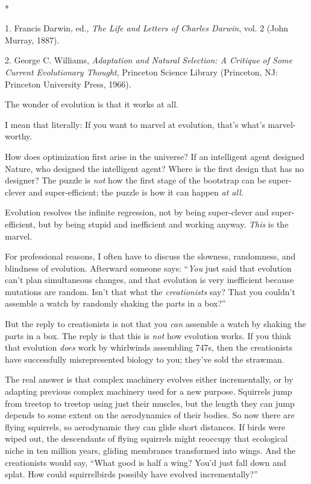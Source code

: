 {\centering
 \ ~
\par}

{\centering
 *
\par}


\bigskip

{
 1. Francis Darwin, ed., \textit{The Life and Letters of Charles
Darwin}, vol. 2 (John Murray, 1887).}

{
 2. George C. Williams, \textit{Adaptation and Natural Selection: A
Critique of Some Current Evolutionary Thought}, Princeton Science
Library (Princeton, NJ: Princeton University Press, 1966).}


{
 The wonder of evolution is that it works at all. }

{
 I mean that literally: If you want to marvel at evolution,
that's what's marvel-worthy.}

{
 How does optimization first arise in the universe? If an
intelligent agent designed Nature, who designed the intelligent agent?
Where is the first design that has no designer? The puzzle is
\textit{not} how the first stage of the bootstrap can be super-clever
and super-efficient; the puzzle is how it can happen \textit{at all.}}

{
 Evolution resolves the infinite regression, not by being
super-clever and super-efficient, but by being stupid and inefficient
and working anyway. \textit{This} is the marvel.}

{
 For professional reasons, I often have to discuss the slowness,
randomness, and blindness of evolution. Afterward someone says:
``\textit{You} just said that evolution
can't plan simultaneous changes, and that evolution is
very inefficient because mutations are random. Isn't
that what the \textit{creationists} say? That you
couldn't assemble a watch by randomly shaking the parts
in a box?''}

{
 But the reply to creationists is not that you \textit{can}
assemble a watch by shaking the parts in a box. The reply is that this
is \textit{not} how evolution works. If you think that evolution
\textit{does} work by whirlwinds assembling 747s, then the creationists
have successfully misrepresented biology to you;
they've sold the strawman.}

{
 The real answer is that complex machinery evolves either
incrementally, or by adapting previous complex machinery used for a new
purpose. Squirrels jump from treetop to treetop using just their
muscles, but the length they can jump depends to some extent on the
aerodynamics of their bodies. So now there are flying squirrels, so
aerodynamic they can glide short distances. If birds were wiped out,
the descendants of flying squirrels might reoccupy that ecological
niche in ten million years, gliding membranes transformed into wings.
And the creationists would say, ``What good is half a
wing? You'd just fall down and splat. How could
squirrelbirds possibly have evolved incrementally?''}

